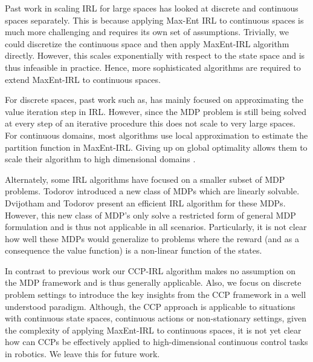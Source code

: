 \documentclass{article}
\begin{document}
Past work in scaling IRL for large spaces has looked at discrete and continuous spaces separately. This is because applying Max-Ent IRL to continuous spaces is much more challenging and requires its own set of assumptions. Trivially, we could discretize the continuous space and then apply MaxEnt-IRL algorithm directly. However, this scales exponentially with respect to the state space and is thus infeasible in practice. Hence, more sophisticated algorithms are required to extend MaxEnt-IRL to continuous spaces. 

For discrete spaces, past work such as, \cite{huang2015approximate} has mainly focused on approximating the value iteration step in IRL. However, since the MDP problem is still being solved at every step of an iterative procedure this does not scale to very large spaces. For continuous domains, most algorithms use local approximation to estimate the partition function in MaxEnt-IRL. Giving up on global optimality allows them to scale their algorithm to high dimensional domains \cite{levine2012continuous, kalakrishnan2013learning, finn2016guided}.

Alternately, some IRL algorithms have focused on a smaller subset of MDP problems. Todorov  introduced a new class of MDPs which are linearly solvable. Dvijotham and Todorov  present an efficient IRL algorithm for these MDPs. However, this new class of MDP's only solve a restricted form of general MDP formulation and is thus not applicable in all scenarios. Particularly, it is not clear how well these MDPs would generalize to problems where the reward (and as a consequence the value function) is a non-linear function of the states.


In contrast to previous work our CCP-IRL algorithm makes no assumption on the MDP framework and is thus generally applicable. 
Also, we focus on discrete problem settings to introduce the key insights from the CCP framework in a well understood paradigm.
Although, the CCP approach is applicable to situations with continuous state spaces, continuous actions or non-stationary settings, given the complexity of applying MaxEnt-IRL to continuous spaces, it is not yet clear how can CCPs be effectively applied to high-dimensional continuous control tasks in robotics. We leave this for future work. 
\end{document}
